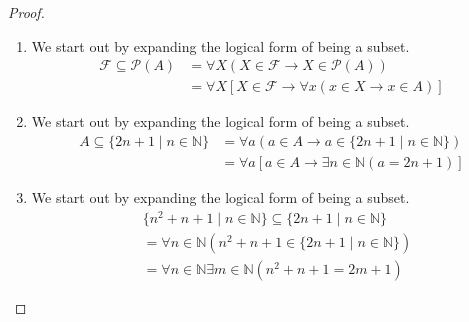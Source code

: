 \documentclass[12pt]{amsart}
\theoremstyle{definition}
\theoremstyle{remark}
\newcommand{\BN}{\mathbb N}
\begin{document}
\begin{proof}
\hfill
\begin{enumerate}
	\item We start out by expanding the logical form of being a subset.
	\begin{align*}
		\mathcal{F} \subseteq \mathscr{P}(A)
		&= \forall X (X \in \mathcal{F} \rightarrow X \in \mathscr{P}(A)) \\
		&= \forall X [X \in \mathcal{F} \rightarrow \forall x(x \in X \rightarrow x \in A)]
	\end{align*}
	
	\item We start out by expanding the logical form of being a subset.
	\begin{align*}
		A \subseteq \{ 2n + 1 \mid n \in \BN \}
		&= \forall a (a \in A \rightarrow a \in \{ 2n + 1 \mid n \in \BN \}) \\
		&= \forall a [a \in A \rightarrow \exists n \in \BN (a = 2n + 1)]
	\end{align*}
	
	\item We start out by expanding the logical form of being a subset.
	\begin{align*}
		& \{ n^2 + n + 1 \mid n \in \BN \} \subseteq \{ 2n + 1 \mid n \in \BN \} \\
		&= \forall n \in \BN (n^2 + n + 1 \in \{ 2n + 1 \mid n \in \BN \}) \\
		&= \forall n \in \BN \exists m \in \BN (n^2 + n + 1 = 2m + 1)
	\end{align*}
	

\end{enumerate}
\end{proof}
\end{document}
